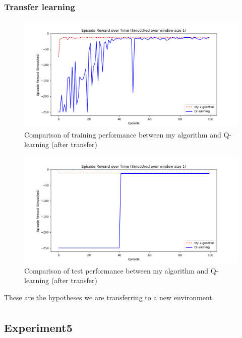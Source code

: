 \subsubsection{Transfer learning}
\begin{figure}[!htb]
\centering
\includegraphics[width=1.0\textwidth]{./figures/experiment4_after_training}
\caption{Comparison of training performance between my algorithm and Q-learning (after transfer)}
\label{experiment3_training}
\end{figure}

\begin{figure}[!htb]
\centering
\includegraphics[width=1.0\textwidth]{./figures/experiment4_after_test}
\caption{Comparison of test performance between my algorithm and Q-learning (after transfer)}
\label{experiment3_test}
\end{figure}

These are the hypotheses we are transferring to a new environment. 
\begin{equation*}
\begin{split}
\end{split}
\end{equation*}

\newpage
\subsection{Experiment5}

